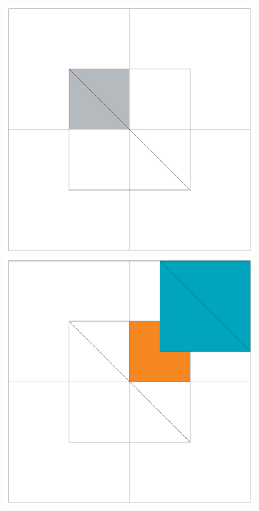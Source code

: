 \begin{figure}[!htb]
  \includegraphics[width=\linewidth]{drawings/examples/cube_example/cubes_07.pdf}
\endminipage
{}%
  \includegraphics[width=\linewidth]{drawings/examples/cube_example/cubes_04.pdf}
  

\end{figure}
